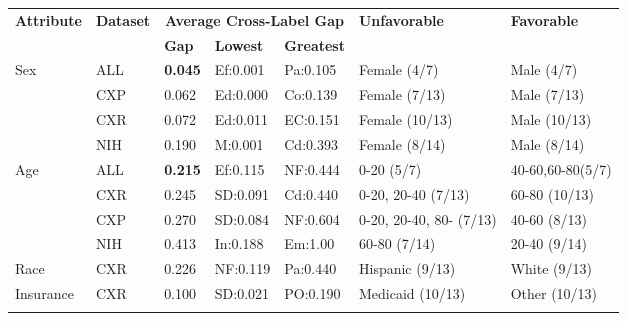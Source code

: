 \documentclass{ws-procs11x85}
\begin{document}
\begin{table}[h]
{\begin{tabular}{@{}lllllll@{}}
\toprule

\textbf{Attribute} & \textbf{Dataset} & \multicolumn{3}{c}{\textbf{Average Cross-Label Gap}} & \textbf{Unfavorable} & \textbf{Favorable}\\
& & \textbf{Gap} & \textbf{Lowest} & \textbf{Greatest} & & \\ \colrule
Sex & ALL & \textbf{0.045} & Ef:0.001 & Pa:0.105        & Female (4/7)       & Male (4/7) \\    
& CXP &  0.062 & Ed:0.000 & Co:0.139       & Female (7/13)       & Male (7/13)  \\
& CXR  & 0.072 & Ed:0.011 & EC:0.151        & Female (10/13)      & Male (10/13)     \\
& NIH & 0.190 & M:0.001 &  Cd:0.393          & Female (8/14)       & Male (8/14) \\ \colrule
Age & ALL  & \textbf{0.215} & Ef:0.115 & NF:0.444       & 0-20 (5/7)        & 40-60,60-80(5/7)  \\
& CXR   & 0.245 & SD:0.091 & Cd:0.440        & 0-20, 20-40 (7/13)         & 60-80 (10/13)  \\ 
& CXP & 0.270 &SD:0.084& NF:0.604       & 0-20, 20-40, 80- (7/13)    & 40-60 (8/13)  \\
& NIH & 0.413 & In:0.188 & Em:1.00      & 60-80 (7/14)        & 20-40 (9/14) \\ \colrule
  Race & CXR  & 0.226  & NF:0.119 &  Pa:0.440         &  Hispanic (9/13)        & White (9/13) \\ \colrule
  Insurance & CXR & 0.100 & SD:0.021 &PO:0.190       & Medicaid (10/13)    & Other (10/13) \\
 \botrule
\end{tabular}}\label{Table:Summary}
\end{table}
\end{document}
